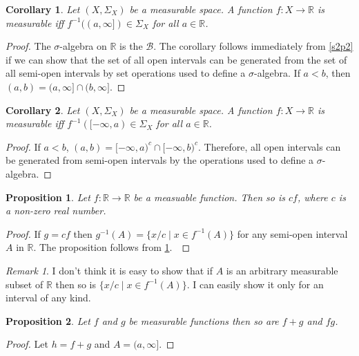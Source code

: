 \documentclass{article}
\newcommand{\sor}{\mathbb{R}}
\theoremstyle{plain}
\numberwithin{thm}{section}
\theoremstyle{plain}
\newtheorem{prop}{Proposition}
\numberwithin{prop}{section}
\theoremstyle{definition}
\numberwithin{defn}{section}
\theoremstyle{remark}
\newtheorem*{rem}{Remark}
\theoremstyle{plain}
\newtheorem{cor}{Corollary}
\numberwithin{cor}{section}
\numberwithin{equation}{section}
\begin{document}
\begin{cor}\label{s2c2}
Let $(X, \Sigma_X)$ be a measurable space. A function $f: X \rightarrow \sor$
is measurable iff $f^{-1}((a, \infty]) \in \Sigma_X$ for all $a \in \sor$.
\end{cor}
\begin{proof}
The $\sigma$-algebra on $\sor$ is the $\mathcal{B}$. The corollary follows
immediately from \ref{s2p2} if we can show that the set of all open intervals
can be generated from the set of all semi-open intervals by set operations used
to define a $\sigma$-algebra. If $a < b$, then $(a, b) = (a, \infty] \cap (b,
\infty]$.
\end{proof}

\begin{cor}\label{s2c3}
Let $(X, \Sigma_X)$ be a measurable space. A function $f: X \rightarrow \sor$
is measurable iff $f^{-1}([-\infty, a) \in \Sigma_X$ for all $a \in \sor$.
\end{cor}
\begin{proof}
If $a < b$, $(a, b) = [-\infty, a)^c \cap [-\infty, b)^c$. Therefore, all open
intervals can be generated from semi-open intervals by the operations used to
define a $\sigma$-algebra.
\end{proof}

\begin{prop}\label{s2p3}
Let $f: \sor \rightarrow \sor$ be a measuable function. Then so is $cf$, where $c$
is a non-zero real number.
\end{prop}
\begin{proof}
If $g = cf$ then $g^{-1}(A) = \{x/c \;|\; x \in f^{-1}(A)\}$ for any semi-open 
interval $A$ in $\mathbb{R}$. The proposition follows from \ref{s2c2}.\
\end{proof}

\begin{rem}
I don't think it is easy to show that if $A$ is an arbitrary measurable subset 
of $\sor$ then so is $\{x/c \;|\; x \in f^{-1}(A)\}$. I can easily show it only 
for an interval of any kind.
\end{rem}

\begin{prop}\label{s2p4}
Let $f$ and $g$ be measurable functions then so are $f + g$ and $fg$.
\end{prop}
\begin{proof}
Let $h = f + g$ and $A = (a, \infty]$.
\end{proof}
\end{document}
